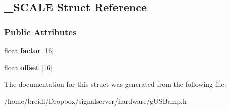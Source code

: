 \hypertarget{struct___s_c_a_l_e}{
\subsection{\_\-SCALE Struct Reference}
\label{struct___s_c_a_l_e}
}
\subsubsection*{Public Attributes}
\begin{DoxyCompactItemize}
\item 
\hypertarget{struct___s_c_a_l_e_a9d4622b303ba5d0ce90e7c37b57deb13}{
float {\bfseries factor} \mbox{[}16\mbox{]}}
\label{struct___s_c_a_l_e_a9d4622b303ba5d0ce90e7c37b57deb13}

\item 
\hypertarget{struct___s_c_a_l_e_abe9fcb2dda1f195e8a54a5f921b2fd47}{
float {\bfseries offset} \mbox{[}16\mbox{]}}
\label{struct___s_c_a_l_e_abe9fcb2dda1f195e8a54a5f921b2fd47}

\end{DoxyCompactItemize}


The documentation for this struct was generated from the following file:\begin{DoxyCompactItemize}
\item 
/home/breidi/Dropbox/signalserver/hardware/gUSBamp.h\end{DoxyCompactItemize}
